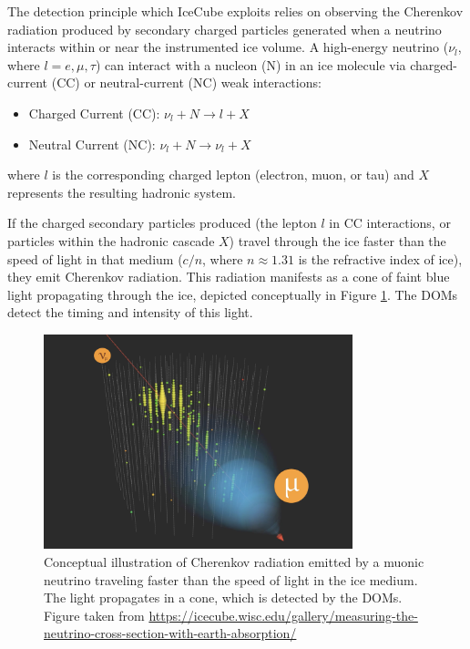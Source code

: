 The detection principle which IceCube exploits relies on observing the Cherenkov radiation produced by secondary charged particles generated when a neutrino interacts within or near the instrumented ice volume. A high-energy neutrino ($ \nu_l $, where $ l = e, \mu, \tau $) can interact with a nucleon (N) in an ice molecule via charged-current (CC) or neutral-current (NC) weak interactions:
\begin{itemize}
    \item Charged Current (CC): $ \nu_l + N \rightarrow l + X $
    \item Neutral Current (NC): $ \nu_l + N \rightarrow \nu_l + X $
\end{itemize}
where $l$ is the corresponding charged lepton (electron, muon, or tau) and $X$ represents the resulting hadronic system.

If the charged secondary particles produced (the lepton $l$ in CC interactions, or particles within the hadronic cascade $X$) travel through the ice faster than the speed of light in that medium ($c/n$, where $n \approx 1.31$ is the refractive index of ice), they emit Cherenkov radiation. This radiation manifests as a cone of faint blue light propagating through the ice, depicted conceptually in Figure \ref{fig:Cherenkov_cone}. The DOMs detect the timing and intensity of this light.

\begin{figure}[H]
    \centering
    \includegraphics[width=0.8\textwidth]{Figures/Cherenkov.jpg}
    \caption{Conceptual illustration of Cherenkov radiation emitted by a muonic neutrino traveling faster than the speed of light in the ice medium. The light propagates in a cone, which is detected by the DOMs. Figure taken from \url{https://icecube.wisc.edu/gallery/measuring-the-neutrino-cross-section-with-earth-absorption/}}
    \label{fig:Cherenkov_cone}
\end{figure}


